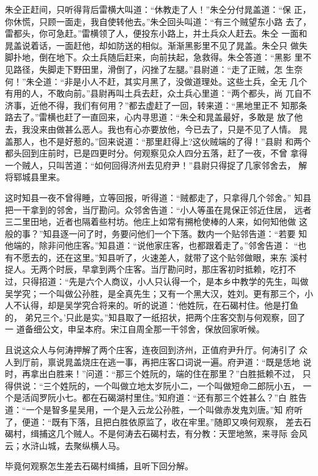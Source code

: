朱仝正赶间，只听得背后雷横大叫道：“休教走了人！”朱仝分付晁盖道：“保
正，你休慌，只顾一面走，我自使转他去。”朱仝回头叫道：“有三个贼望东小路
去了，雷都头，你可急赶。”雷横领了人，便投东小路上，并土兵众人赶去。朱仝
一面和晁盖说着话，一面赶他，却如防送的相似。渐渐黑影里不见了晁盖。朱仝只
做失脚扑地，倒在地下。众土兵随后赶来，向前扶起，急救得。朱仝答道：“黑影
里不见路径，失脚走下野田里，滑倒了，闪挫了左腿。”县尉道：“走了正贼，怎
生奈何！”朱仝道：“非是小人不赶，其实月黑了，没做道理处。这些土兵，全无
几个有用的人，不敢向前。”县尉再叫土兵去赶，众土兵心里道：“两个都头，尚
兀自不济事，近他不得，我们有何用？”都去虚赶了一回，转来道：“黑地里正不
知那条路去了。”雷横也赶了一直回来，心内寻思道：“朱仝和晁盖最好，多敢是
放了他去，我没来由做甚么恶人。我也有心亦要放他，今已去了，只是不见了人情。
晁盖那人，也不是好惹的。”回来说道：“那里赶得上?这伙贼端的了得！”县尉
和两个都头回到庄前时，已是四更时分。何观察见众人四分五落，赶了一夜，不曾
拿得一个贼人，只叫苦道：“如何回得济州去见府尹！”县尉只得捉了几家邻舍去，
解将郓城县里来。

这时知县一夜不曾得睡，立等回报，听得道：“贼都走了，只拿得几个邻舍。”
知县把一干拿到的邻舍，当厅勘问。众邻舍告道：“小人等虽在晁保正邻近住居，
远者三二里田地，近者也隔着些村坊。他庄上如常有搠枪使棒的人来，如何知他做
这般的事？”知县逐一问了时，务要问他们一个下落。数内一个贴邻告道：“若要
知他端的，除非问他庄客。”知县道：“说他家庄客，也都跟着走了。”邻舍告道：
“也有不愿去的，还在这里。”知县听了，火速差人，就带了这个贴邻做眼，来东
溪村捉人。无两个时辰，早拿到两个庄客。当厅勘问时，那庄客初时抵赖，吃打不
过，只得招道：“先是六个人商议，小人只认得一个，是本乡中教学的先生，叫做
吴学究；一个叫做公孙胜，是全真先生；又有一个黑大汉，姓刘。更有那三个，小
人不认得，却是吴学究合将来的。听的说道：‘他姓阮，在石碣村住。他是打鱼的，
弟兄三个。’只此是实。”知县取了一纸招状，把两个庄客交割与何观察，回了一
道备细公文，申呈本府。宋江自周全那一干邻舍，保放回家听候。

且说这众人与何涛押解了两个庄客，连夜回到济州，正值府尹升厅。何涛引了
众人到厅前，禀说晁盖烧庄在逃一事，再把庄客口词说一遍。府尹道：“既是恁地
说时，再拿出白胜来！”问道：“那三个姓阮的，端的住在那里？”白胜抵赖不过，
只得供说：“三个姓阮的，一个叫做立地太岁阮小二，一个叫做短命二郎阮小五，
一个是活阎罗阮小七。都在石碣湖村里住。”知府道：“还有那三个姓甚么？”白
胜告道：“一个是智多星吴用，一个是入云龙公孙胜，一个叫做赤发鬼刘唐。”知
府听了，便道：“既有下落，且把白胜依原监了，收在牢里。”随即又唤何观察，
差去石碣村，缉捕这几个贼人。不是何涛去石碣村去，有分教：天罡地煞，来寻际
会风云；水浒山城，去聚纵横人马。

毕竟何观察怎生差去石碣村缉捕，且听下回分解。